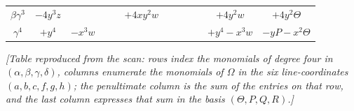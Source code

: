\documentclass[11pt]{article}
\begin{document}
\begin{landscape}
\begin{center}
{\begin{tabular}{|c|c|c|c|c|c|c|c|c|c|c|c|}
$\beta\gamma^3$         & $-4y^3z$  &   &           &           & $+4xy^2w$ &           &           &           &           & $+4y^2w$                                           & $+4y^2\Theta$\\
$\gamma^4$              & $+y^4$    & $-x^3w$ &     &           &           &           &           &           &           & $+y^4-x^3w$                                        & $-yP-x^2\Theta$\\
\hline
\end{tabular}}
\end{center}
\medskip
\noindent\textit{[Table reproduced from the scan: rows index the monomials of degree four in $(\alpha,\beta,\gamma,\delta)$, columns enumerate the monomials of $\Omega$ in the six line-coordinates $(a,b,c,f,g,h)$; the penultimate column is the sum of the entries on that row, and the last column expresses that sum in the basis $(\Theta, P, Q, R)$.]}
\end{landscape}

\medskip
\end{document}
